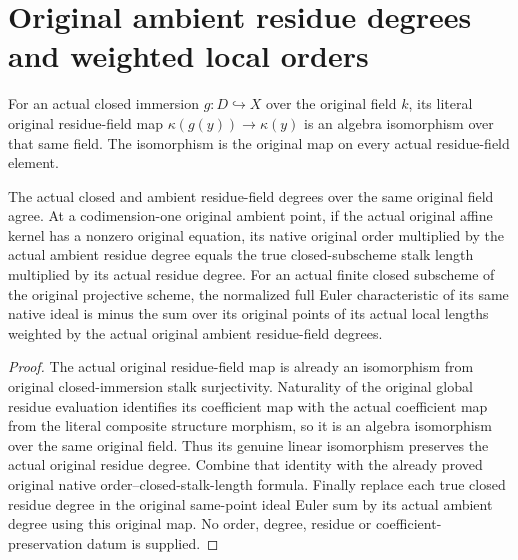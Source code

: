 \section{Original ambient residue degrees and weighted local orders}

\begin{definition}
\label{def:fc-closed-immersion-residue-algebra}
\leanok
{}
For an actual closed immersion $g:D\hookrightarrow X$ over the original
field $k$, its literal original residue-field map
$\kappa(g(y))\to\kappa(y)$ is an algebra isomorphism over that same field.
The isomorphism is the original map on every actual residue-field element.
\end{definition}

\begin{theorem}
\label{thm:fc-closed-immersion-residue-degrees}
\leanok
{}
The actual closed and ambient residue-field degrees over the same original
field agree. At a codimension-one original ambient point, if the actual
original affine kernel has a nonzero original equation, its native original
order multiplied by the actual ambient residue degree equals the true
closed-subscheme stalk length multiplied by its actual residue degree.
For an actual finite closed subscheme of the original projective scheme,
the normalized full Euler characteristic of its same native ideal is minus
the sum over its original points of its actual local lengths weighted by
the actual original ambient residue-field degrees.
\end{theorem}
\begin{proof}
The actual original residue-field map is already an isomorphism from original
closed-immersion stalk surjectivity. Naturality of the original global
residue evaluation identifies its coefficient map with the actual coefficient
map from the literal composite structure morphism, so it is an algebra
isomorphism over the same original field. Thus its genuine linear
isomorphism preserves the actual original residue degree. Combine that
identity with the already proved original native order--closed-stalk-length
formula. Finally replace each true closed residue degree in the original
same-point ideal Euler sum by its actual ambient degree using this original
map. No order, degree, residue or coefficient-preservation datum is supplied.
\end{proof}
